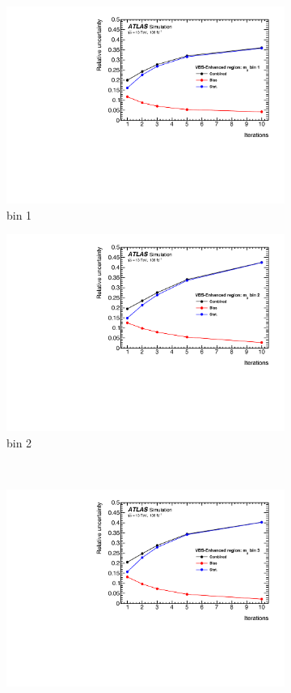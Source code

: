 \begin{figure}[htb]
    \centering
    \begin{subfigure}{.48\textwidth}
        \centering
        \includegraphics[width=.9\linewidth]{figures/Analysis/Unfolding/unfolding_bias_stat_unc_mjj_VBSEnh_bin1.pdf}
        \caption{ bin 1}
    \end{subfigure}
    \begin{subfigure}{.48\textwidth}
        \centering
        \includegraphics[width=.9\linewidth]{figures/Analysis/Unfolding/unfolding_bias_stat_unc_mjj_VBSEnh_bin2.pdf}
        \caption{bin 2 }
    \end{subfigure}\\
    \begin{subfigure}{.48\textwidth}
        \centering
        \includegraphics[width=.9\linewidth]{figures/Analysis/Unfolding/unfolding_bias_stat_unc_mjj_VBSEnh_bin3.pdf}

\end{subfigure}
\end{figure}
